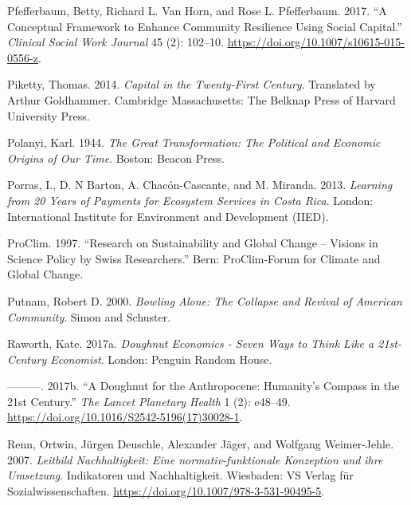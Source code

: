 \documentclass[
  a4paper,
  openany]{book}
\newlength{\cslhangindent}
\newenvironment{CSLReferences}[2] %
 {\begin{list}{}{%
  \setlength{\itemindent}{0pt}
  \setlength{\leftmargin}{0pt}
  \setlength{\parsep}{0pt}
  \ifodd #1
   \setlength{\leftmargin}{\cslhangindent}
   \setlength{\itemindent}{-1\cslhangindent}
  \fi
  \setlength{\itemsep}{#2\baselineskip}}}
 {\end{list}}
\begin{document}
\begin{CSLReferences}{1}{0}
Pfefferbaum, Betty, Richard L. Van Horn, and Rose L. Pfefferbaum. 2017.
{``A {Conceptual Framework} to {Enhance Community Resilience Using
Social Capital}.''} \emph{Clinical Social Work Journal} 45 (2): 102--10.
\url{https://doi.org/10.1007/s10615-015-0556-z}.

Piketty, Thomas. 2014. \emph{Capital in the {Twenty-First Century}}.
Translated by Arthur Goldhammer. Cambridge Massachusetts: The Belknap
Press of Harvard University Press.

Polanyi, Karl. 1944. \emph{The {Great Transformation}: {The Political}
and {Economic Origins} of {Our Time}}. Boston: Beacon Press.

Porras, I., D. N Barton, A. Chacón-Cascante, and M. Miranda. 2013.
\emph{Learning from 20 Years of {Payments} for {Ecosystem Services} in
{Costa Rica}}. London: {International Institute for Environment and
Development (IIED)}.

ProClim. 1997. {``Research on {Sustainability} and {Global Change} --
{Visions} in {Science Policy} by {Swiss Researchers}.''} Bern:
{ProClim-Forum for Climate and Global Change}.

Putnam, Robert D. 2000. \emph{Bowling {Alone}: {The Collapse} and
{Revival} of {American Community}}. {Simon and Schuster}.

Raworth, Kate. 2017a. \emph{Doughnut {Economics} - {Seven Ways} to
{Think Like} a 21st-{Century Economist}}. London: Penguin Random House.

---------. 2017b. {``A {Doughnut} for the {Anthropocene}: Humanity's
Compass in the 21st Century.''} \emph{The Lancet Planetary Health} 1
(2): e48--49. \url{https://doi.org/10.1016/S2542-5196(17)30028-1}.

Renn, Ortwin, Jürgen Deuschle, Alexander Jäger, and Wolfgang
Weimer-Jehle. 2007. \emph{{Leitbild Nachhaltigkeit: Eine
normativ-funktionale Konzeption und ihre Umsetzung}}. {Indikatoren und
Nachhaltigkeit}. Wiesbaden: VS Verlag f{ü}r Sozialwissenschaften.
\url{https://doi.org/10.1007/978-3-531-90495-5}.


\end{CSLReferences}
\end{document}
